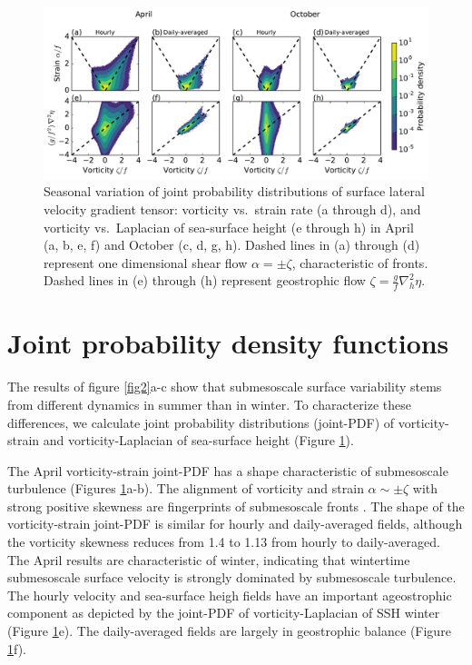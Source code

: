 \documentclass[grl]{agutex2015}
\begin{document}
\begin{article}
\begin{figure}[ht]
  \begin{center}
    \includegraphics[width=.75\textwidth]{figs/fig3.pdf}
 \caption{\small Seasonal variation of joint probability distributions of
          surface lateral velocity gradient tensor:  vorticity vs.\
          strain rate (a through d),
          and vorticity vs.\ Laplacian of sea-surface height (e through h) in April (a, b,
          e, f) and October (c, d, g, h).
          Dashed lines in (a) through (d) represent one dimensional shear flow $\alpha = \pm\zeta$,
          characteristic of fronts. Dashed lines in (e) through
          (h) represent geostrophic flow $\zeta = \frac{g}{f}\nabla_h^2 \eta$.}
 \label{fig3}
 \end{center}
\end{figure}

\section{Joint probability density functions}

The results of figure \ref{fig2}a-c show that submesoscale surface
 variability stems from different dynamics in summer than in winter.
 To characterize these differences, we calculate
joint probability distributions (joint-PDF) of
vorticity-strain and vorticity-Laplacian of sea-surface height (Figure \ref{fig3}).

The April vorticity-strain joint-PDF has a shape characteristic of submesoscale turbulence
 (Figures \ref{fig3}a-b). The alignment of vorticity and strain $\alpha \sim \pm\zeta$
 with strong positive skewness are fingerprints of submesoscale fronts
 \citep{shcherbina_etal2013,mcwilliams2016}. The shape of the vorticity-strain
 joint-PDF is similar for hourly and daily-averaged fields, although
 the vorticity skewness reduces from 1.4 to 1.13 from hourly to daily-averaged.
 The April results are characteristic of winter, indicating that wintertime submesoscale
 surface velocity is strongly dominated by submesoscale turbulence.
 The hourly velocity and sea-surface heigh fields have an important
ageostrophic component as depicted by the joint-PDF of vorticity-Laplacian of SSH
winter (Figure \ref{fig3}e). The daily-averaged fields
are largely
in  geostrophic balance (Figure \ref{fig3}f).


\end{article}
\end{document}
